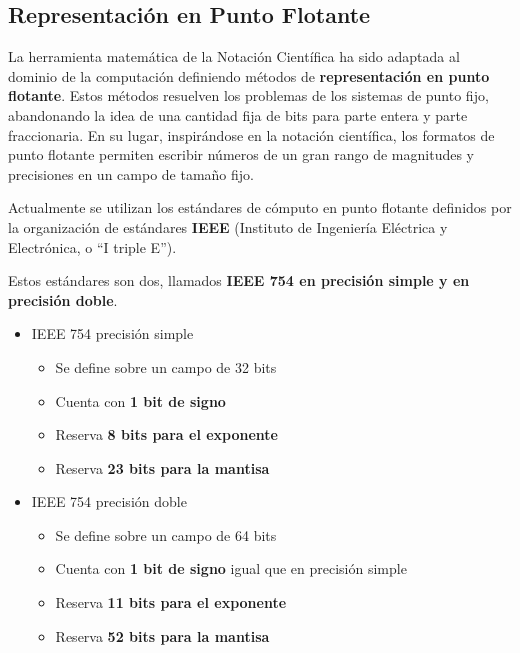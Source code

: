\documentclass[spanish,A4,]{article}
\begin{document}
\subsection{Representación en Punto
Flotante}\label{representaciuxf3n-en-punto-flotante}

La herramienta matemática de la Notación Científica ha sido adaptada al
dominio de la computación definiendo métodos de \textbf{representación
en punto flotante}. Estos métodos resuelven los problemas de los
sistemas de punto fijo, abandonando la idea de una cantidad fija de bits
para parte entera y parte fraccionaria. En su lugar, inspirándose en la
notación científica, los formatos de punto flotante permiten escribir
números de un gran rango de magnitudes y precisiones en un campo de
tamaño fijo.

Actualmente se utilizan los estándares de cómputo en punto flotante
definidos por la organización de estándares \textbf{IEEE} (Instituto de
Ingeniería Eléctrica y Electrónica, o ``I triple E'').

Estos estándares son dos, llamados \textbf{IEEE 754 en precisión simple
y en precisión doble}.

\begin{itemize}
\itemsep1pt\parskip0pt
\item
  IEEE 754 precisión simple

  \begin{itemize}
  \itemsep1pt\parskip0pt
  \item
    Se define sobre un campo de 32 bits
  \item
    Cuenta con \textbf{1 bit de signo}
  \item
    Reserva \textbf{8 bits para el exponente}
  \item
    Reserva \textbf{23 bits para la mantisa}
  \end{itemize}
\item
  IEEE 754 precisión doble

  \begin{itemize}
  \itemsep1pt\parskip0pt
  \item
    Se define sobre un campo de 64 bits
  \item
    Cuenta con \textbf{1 bit de signo} igual que en precisión simple
  \item
    Reserva \textbf{11 bits para el exponente}
  \item
    Reserva \textbf{52 bits para la mantisa}
  \end{itemize}
\end{itemize}
\end{document}
